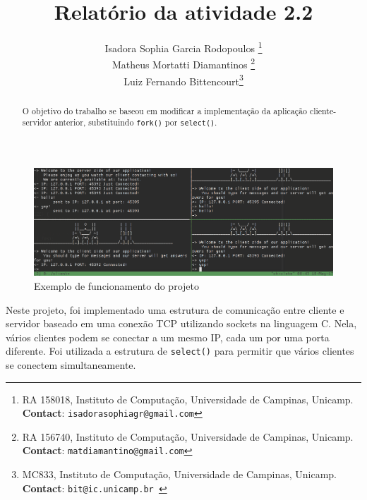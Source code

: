 \documentclass[10pt,twocolumn,letterpaper]{article}
\begin{document}
\title{Relatório da atividade 2.2}
\author{Isadora Sophia Garcia Rodopoulos \thanks{RA 158018, Instituto de Computação, Universidade de Campinas, Unicamp. \textbf{Contact}: \tt\small{isadorasophiagr@gmail.com}} \\
Matheus Mortatti Diamantinos \thanks{RA 156740, Instituto de Computação, Universidade de Campinas, Unicamp. \textbf{Contact}: \tt\small{matdiamantino@gmail.com}}\\
Luiz Fernando Bittencourt\thanks{MC833, Instituto de Computação, Universidade de Campinas, Unicamp. \textbf{Contact}: \tt\small{bit@ic.unicamp.br }}\\
}

\maketitle
\begin{abstract}
O objetivo do trabalho se baseou em modificar a implementação da aplicação cliente-servidor
anterior, substituindo \texttt{fork()} por \texttt{select()}.
\end{abstract}

\begin{figure}
\begin{center}
    \includegraphics[width=1\textwidth]{img/sample.png}
    \caption{Exemplo de funcionamento do projeto}   
\end{center} 
\end{figure}

Neste projeto, foi implementado uma estrutura de comunicação entre cliente e servidor baseado em uma conexão TCP utilizando sockets na linguagem C. Nela, vários clientes podem se conectar a um mesmo IP, cada um por uma porta diferente. Foi utilizada a estrutura de \texttt{select()} para permitir que vários clientes se conectem simultaneamente.
\end{document}

